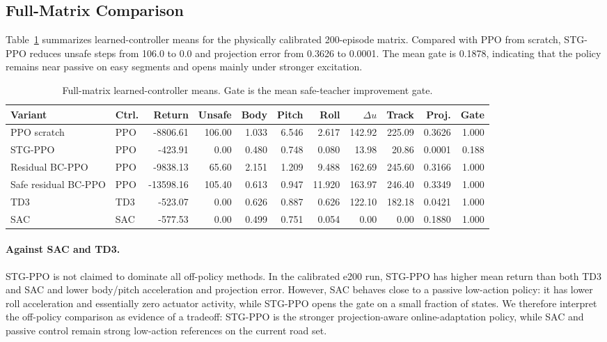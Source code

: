 \documentclass[letterpaper,twocolumn]{article}
\begin{document}
\subsection{Full-Matrix Comparison}

Table~\ref{tab:full} summarizes learned-controller means for the physically calibrated 200-episode matrix.
Compared with PPO from scratch, STG-PPO reduces unsafe steps from 106.0 to 0.0 and projection error from 0.3626 to 0.0001.
The mean gate is 0.1878, indicating that the policy remains near passive on easy segments and opens mainly under stronger excitation.

\begin{table}[t]
\centering
\caption{Full-matrix learned-controller means. Gate is the mean safe-teacher improvement gate.}
\label{tab:full}
\begin{tabular}{llrrrrrrrrr}
\toprule
Variant & Ctrl. & Return & Unsafe & Body & Pitch & Roll & $\Delta u$ & Track & Proj. & Gate \\
\midrule
PPO scratch & PPO & -8806.61 & 106.00 & 1.033 & 6.546 & 2.617 & 142.92 & 225.09 & 0.3626 & 1.000 \\
STG-PPO & PPO & -423.91 & 0.00 & 0.480 & 0.748 & 0.080 & 13.98 & 20.86 & 0.0001 & 0.188 \\
Residual BC-PPO & PPO & -9838.13 & 65.60 & 2.151 & 1.209 & 9.488 & 162.69 & 245.60 & 0.3166 & 1.000 \\
Safe residual BC-PPO & PPO & -13598.16 & 105.40 & 0.613 & 0.947 & 11.920 & 163.97 & 246.40 & 0.3349 & 1.000 \\
TD3 & TD3 & -523.07 & 0.00 & 0.626 & 0.887 & 0.626 & 122.10 & 182.18 & 0.0421 & 1.000 \\
SAC & SAC & -577.53 & 0.00 & 0.499 & 0.751 & 0.054 & 0.00 & 0.00 & 0.1880 & 1.000 \\
\bottomrule
\end{tabular}
\end{table}

\paragraph{Against SAC and TD3.}
STG-PPO is not claimed to dominate all off-policy methods.
In the calibrated e200 run, STG-PPO has higher mean return than both TD3 and SAC and lower body/pitch acceleration and projection error.
However, SAC behaves close to a passive low-action policy: it has lower roll acceleration and essentially zero actuator activity, while STG-PPO opens the gate on a small fraction of states.
We therefore interpret the off-policy comparison as evidence of a tradeoff: STG-PPO is the stronger projection-aware online-adaptation policy, while SAC and passive control remain strong low-action references on the current road set.
\end{document}

